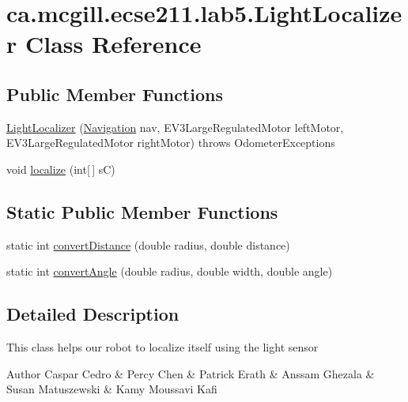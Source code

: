 \hypertarget{classca_1_1mcgill_1_1ecse211_1_1lab5_1_1_light_localizer}{}\section{ca.\+mcgill.\+ecse211.\+lab5.\+Light\+Localizer Class Reference}
\label{classca_1_1mcgill_1_1ecse211_1_1lab5_1_1_light_localizer}
\subsection*{Public Member Functions}
\begin{DoxyCompactItemize}
\item 
\hyperlink{classca_1_1mcgill_1_1ecse211_1_1lab5_1_1_light_localizer_a83dbb9eaea19092e27f6f9acdd35d37a}{Light\+Localizer} (\hyperlink{classca_1_1mcgill_1_1ecse211_1_1lab5_1_1_navigation}{Navigation} nav, E\+V3\+Large\+Regulated\+Motor left\+Motor, E\+V3\+Large\+Regulated\+Motor right\+Motor)  throws Odometer\+Exceptions 
\item 
void \hyperlink{classca_1_1mcgill_1_1ecse211_1_1lab5_1_1_light_localizer_a441f56a899fae5bc9c1d6a6d25fbe0bb}{localize} (int\mbox{[}$\,$\mbox{]} sC)
\end{DoxyCompactItemize}
\subsection*{Static Public Member Functions}
\begin{DoxyCompactItemize}
\item 
static int \hyperlink{classca_1_1mcgill_1_1ecse211_1_1lab5_1_1_light_localizer_a9eebe889aa2d4d2e881f413cc727cd9c}{convert\+Distance} (double radius, double distance)
\item 
static int \hyperlink{classca_1_1mcgill_1_1ecse211_1_1lab5_1_1_light_localizer_ab9d7289c4badf692fd5c83635305f2c5}{convert\+Angle} (double radius, double width, double angle)
\end{DoxyCompactItemize}


\subsection{Detailed Description}
This class helps our robot to localize itself using the light sensor

\begin{DoxyAuthor}{Author}
Caspar Cedro \& Percy Chen \& Patrick Erath \& Anssam Ghezala \& Susan Matuszewski \& Kamy Moussavi Kafi 
\end{DoxyAuthor}


